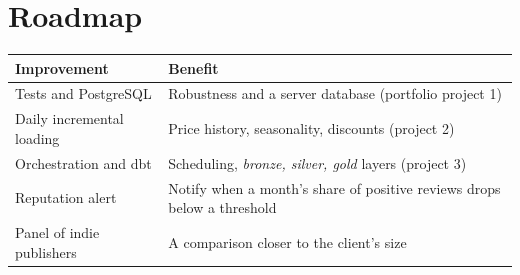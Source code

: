 \documentclass[11pt, a4paper, oneside, headings=normal, numbers=noenddot, DIV=12]{scrartcl}
\begin{document}
\section{Roadmap}
\begin{tabularx}{\linewidth}{@{}L{4.3cm} Y@{}}
\toprule
\textbf{Improvement} & \textbf{Benefit} \\
\midrule
Tests and PostgreSQL & Robustness and a server database (portfolio project 1) \\
Daily incremental loading & Price history, seasonality, discounts (project 2) \\
Orchestration and dbt & Scheduling, \emph{bronze, silver, gold} layers (project 3) \\
Reputation alert & Notify when a month's share of positive reviews drops below a threshold \\
Panel of indie publishers & A comparison closer to the client's size \\
\bottomrule
\end{tabularx}

\appendix
\end{document}

